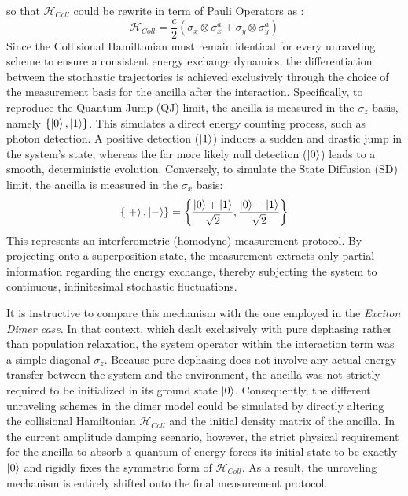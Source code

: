 \documentclass[a4paper,12pt]{article}
\begin{document}
so that $ \mathcal{H}_{Coll} $ could be rewrite in term of Pauli Operators as : 
\begin{equation}
	\mathcal{H}_{Coll} = \frac{c}{2} \left( \sigma_{x} \otimes \sigma_{x}^{a} + \sigma_{y} \otimes \sigma_{y}^{a} \right)
	\label{eq:H_Coll_explicit_PE_Pauli}
\end{equation}
Since the Collisional Hamiltonian must remain identical for every unraveling scheme to ensure a consistent energy exchange dynamics, the differentiation between the stochastic trajectories is achieved exclusively through the choice of the measurement basis for the ancilla after the interaction. \newline
Specifically, to reproduce the Quantum Jump (QJ) limit, the ancilla is measured in the $\sigma_{z}$ basis, namely $\{ \ket{0}, \ket{1} \}$. This simulates a direct energy counting process, such as photon detection. A positive detection ($\ket{1}$) induces a sudden and drastic jump in the system's state, whereas the far more likely null detection ($\ket{0}$) leads to a smooth, deterministic evolution. \newline
Conversely, to simulate the State Diffusion (SD) limit, the ancilla is measured in the $\sigma_{x}$ basis: 
\begin{equation}
	\{ \ket{+}, \ket{-} \} = \left\{ \frac{\ket{0} + \ket{1}}{\sqrt{2}}, \frac{\ket{0} - \ket{1}}{\sqrt{2}} \right\}
\end{equation}
This represents an interferometric (homodyne) measurement protocol. By projecting onto a superposition state, the measurement extracts only partial information regarding the energy exchange, thereby subjecting the system to continuous, infinitesimal stochastic fluctuations.

It is instructive to compare this mechanism with the one employed in the \textit{Exciton Dimer case}. In that context, which dealt exclusively with pure dephasing rather than population relaxation, the system operator within the interaction term was a simple diagonal $\sigma_{z}$. Because pure dephasing does not involve any actual energy transfer between the system and the environment, the ancilla was not strictly required to be initialized in its ground state $\ket{0}$. Consequently, the different unraveling schemes in the dimer model could be simulated by directly altering the collisional Hamiltonian $\mathcal{H}_{Coll}$ and the initial density matrix of the ancilla. In the current amplitude damping scenario, however, the strict physical requirement for the ancilla to absorb a quantum of energy forces its initial state to be exactly $\ket{0}$ and rigidly fixes the symmetric form of $\mathcal{H}_{Coll}$. As a result, the unraveling mechanism is entirely shifted onto the final measurement protocol.
\end{document}
